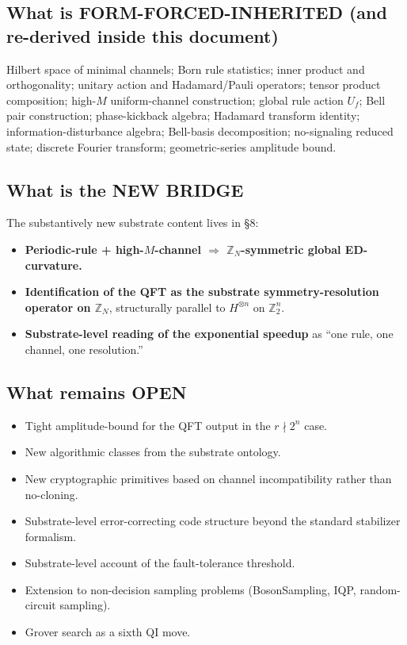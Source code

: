 \documentclass[11pt,a4paper]{article}
\begin{document}
\subsection*{What is FORM-FORCED-INHERITED (and re-derived inside this document)}

Hilbert space of minimal channels; Born rule statistics; inner product and orthogonality; unitary action and Hadamard/Pauli operators; tensor product composition; high-$M$ uniform-channel construction; global rule action $U_f$; Bell pair construction; phase-kickback algebra; Hadamard transform identity; information-disturbance algebra; Bell-basis decomposition; no-signaling reduced state; discrete Fourier transform; geometric-series amplitude bound.

\subsection*{What is the NEW BRIDGE}

The substantively new substrate content lives in \S8:

\begin{itemize}[noitemsep]
  \item \textbf{Periodic-rule + high-$M$-channel $\Rightarrow$ $\mathbb{Z}_N$-symmetric global ED-curvature.}
  \item \textbf{Identification of the QFT as the substrate symmetry-resolution operator on $\mathbb{Z}_N$}, structurally parallel to $H^{\otimes n}$ on $\mathbb{Z}_2^n$.
  \item \textbf{Substrate-level reading of the exponential speedup} as ``one rule, one channel, one resolution.''
\end{itemize}

\subsection*{What remains OPEN}

\begin{itemize}[noitemsep]
  \item Tight amplitude-bound for the QFT output in the $r \nmid 2^n$ case.
  \item New algorithmic classes from the substrate ontology.
  \item New cryptographic primitives based on channel incompatibility rather than no-cloning.
  \item Substrate-level error-correcting code structure beyond the standard stabilizer formalism.
  \item Substrate-level account of the fault-tolerance threshold.
  \item Extension to non-decision sampling problems (BosonSampling, IQP, random-circuit sampling).
  \item Grover search as a sixth QI move.
\end{itemize}
\end{document}
